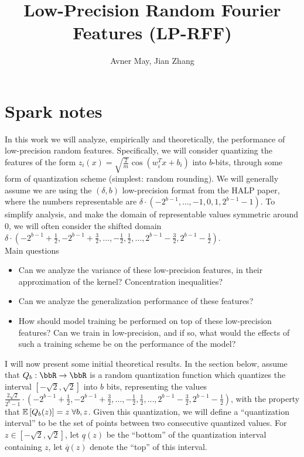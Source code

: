 \documentclass[12pt]{article}
\newcommand{\sq}{\sqrt{2}}
\newcommand{\ulq}{\underline{q}}
\newcommand{\olq}{\overline{q}}
\begin{document}
\title{Low-Precision Random Fourier Features (LP-RFF)}
\author{Avner May, Jian Zhang}
\onehalfspacing
\maketitle

\section{Spark notes}
In this work we will analyze, empirically and theoretically, the performance of low-precision random features.  Specifically, we will consider quantizing the features of the form $z_i(x) = \sqrt{\frac{2}{m}} \cos(w_i^Tx+b_i)$ into $b$-bits, through some form of quantization scheme (simplest: random rounding).  We will generally assume we are using the $(\delta,b)$ low-precision format from the HALP paper, where the numbers representable are $\delta\cdot (-2^{b-1},\ldots,-1,0,1,2^{b-1}-1)$.  To simplify analysis, and make the domain of representable values symmetric around 0, we will often consider the shifted domain $\delta \cdot (-2^{b-1} + \frac{1}{2}, -2^{b-1} + \frac{3}{2},\ldots, -\frac{1}{2},\frac{1}{2},\ldots, 2^{b-1}-\frac{3}{2}, 2^{b-1}-\frac{1}{2})$.  \\

\noindent Main questions
\begin{itemize}
	\item Can we analyze the variance of these low-precision features, in their approximation of the kernel?  Concentration inequalities?
	\item Can we analyze the generalization performance of these features?
	\item How should model training be performed on top of these low-precision features? Can we train in low-precision, and if so, what would the effects of such a training scheme be on the performance of the model?
\end{itemize}

I will now present some initial theoretical results.  In the section below, assume that $Q_b:\RR\rightarrow\RR$ is a random quantization function which quantizes the interval $[-\sq,\sq]$ into $b$ bits, representing the values $\frac{2\sq}{2^b-1} \cdot (-2^{b-1} + \frac{1}{2}, -2^{b-1} + \frac{3}{2},\ldots, -\frac{1}{2},\frac{1}{2},\ldots, 2^{b-1}-\frac{3}{2}, 2^{b-1}-\frac{1}{2})$, with the property that $\expect{}{Q_b(z)} = z \; \forall b,z$.  Given this quantization, we will define a ``quantization interval'' to be the set of points between two consecutive quantized values.
For $z\in [-\sq,\sq]$, let $\ulq(z)$ be the ``bottom'' of the quantization interval containing $z$, let $\olq(z)$ denote the ``top'' of this interval.
\end{document}
